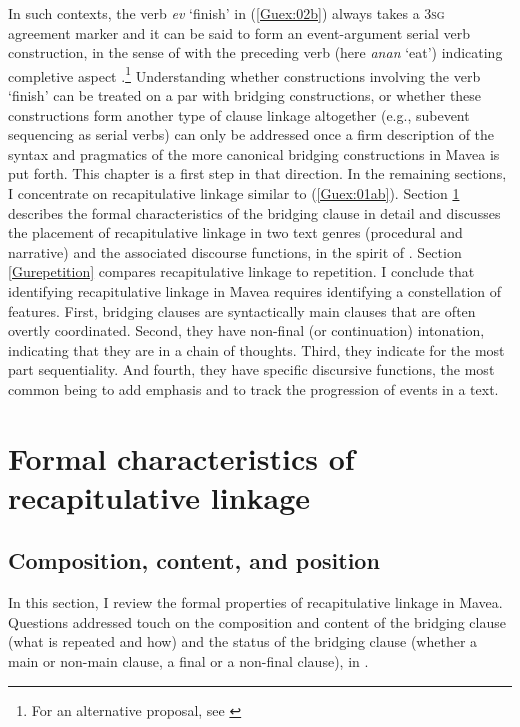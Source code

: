 \documentclass[output=paper]{LSP/langsci}
\begin{document}
In such contexts, the verb \textit{ev} `finish' in (\ref{Guex:02b}) always takes a \textsc{3sg} agreement marker and it can be said to form an event-argument serial verb construction, in the sense of \citet[][18]{aikhenvald2006serial}  with the preceding verb (here \textit{anan} `eat') indicating completive aspect \citep[][225, 267]{guerin11}.\footnote{For an alternative proposal, see \citet[][131, 241]{cleary15}} Understanding whether constructions involving the verb `finish' can be treated on a par with bridging constructions, or whether these constructions form another type of clause linkage altogether (e.g., subevent sequencing as serial verbs) can only be addressed once a firm description of the syntax and pragmatics of the more canonical bridging constructions in Mavea is put forth. This chapter is a first step in that direction. In the remaining sections, I concentrate on recapitulative linkage similar to (\ref{Guex:01ab}).  Section \ref{Gusec:recapitulative} describes the formal characteristics of the bridging clause in detail and  discusses the placement of recapitulative linkage in two text genres (procedural and narrative) and the associated discourse functions, in the spirit of \citet{devries.2005}. Section \ref{Gurepetition} compares recapitulative linkage to repetition. I conclude that identifying recapitulative linkage in Mavea requires identifying a constellation of features. First, bridging clauses are syntactically main clauses that are often overtly coordinated. Second, they have non-final (or continuation) intonation, indicating that they are in a chain of thoughts. Third, they indicate for the most part sequentiality. And fourth, they have specific discursive functions, the most common being to add emphasis and to track the progression of events in a text.


\section{Formal characteristics of recapitulative linkage} 
\label{Gusec:recapitulative}

\subsection{Composition, content, and position} 
\label{Gusec:Composition}
In this section, I review the formal properties of recapitulative linkage in Mavea. Questions addressed touch on the composition and content of the bridging clause (what is repeated and how) and the status of the bridging clause (whether a main or non-main clause, a final or a non-final clause), in .
\end{document}

